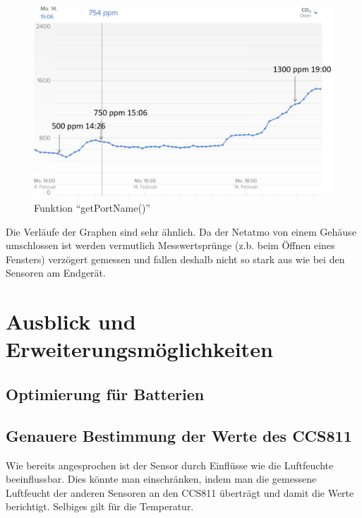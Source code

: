 \documentclass[]{article}
\begin{document}
			\begin{figure}[!h]
				\centering
				\includegraphics[scale=0.18]{images/CO2_NETATMO}
				\caption{Funktion “getPortName()”}
				\label{img:CO2_NETATMO}
			\end{figure}
		
		
			Die Verläufe der Graphen sind sehr ähnlich. Da der Netatmo von einem Gehäuse umschlossen ist werden vermutlich Messwertsprünge (z.b. beim Öffnen eines Fensters) verzögert gemessen und fallen deshalb nicht so stark aus wie bei den Sensoren am Endgerät.
			\clearpage
	\section{Ausblick und Erweiterungsmöglichkeiten}
		\subsection{Optimierung für Batterien}
		\subsection{Genauere Bestimmung der Werte des CCS811}
			Wie bereits angesprochen ist der Sensor durch Einflüsse wie die Luftfeuchte beeinflussbar. Dies könnte man einschränken, indem man die gemessene Luftfeucht  der anderen Sensoren an den CCS811 überträgt und damit die Werte berichtigt. Selbiges gilt für die Temperatur. 
		
\end{document}
